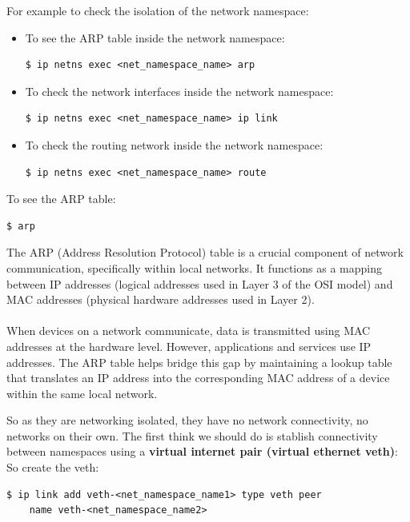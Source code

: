 \documentclass{article}
\newenvironment{blocktemplateII}[1]{%
    \tcolorbox[beamer,%
    noparskip,breakable,
    colframe=Green,%
    colbacklower=LimeGreen!75!LightGreen,%
    title=#1]}%
    {\endtcolorbox}
\newenvironment{codetemplate}[1][]{%
  \mybasecolorbox[#1]
  \itshape
}{%
  \endmybasecolorbox
}
\begin{document}
For example to check the isolation of the network namespace:
\begin{itemize}
    \item To see the ARP table inside the network namespace:
\begin{codetemplate}{}
\begin{verbatim}
$ ip netns exec <net_namespace_name> arp
\end{verbatim}
\end{codetemplate}
    \item To check the network interfaces inside the network namespace:
\begin{codetemplate}{}
\begin{verbatim}
$ ip netns exec <net_namespace_name> ip link
\end{verbatim}
\end{codetemplate}
    \item To check the routing network inside the network namespace:
\begin{codetemplate}{}
\begin{verbatim}
$ ip netns exec <net_namespace_name> route
\end{verbatim}
\end{codetemplate}
\end{itemize}

To see the ARP table:
\begin{codetemplate}{}
\begin{verbatim}
$ arp
\end{verbatim}
\end{codetemplate}

\begin{blocktemplateII}{NOTE}
The ARP (Address Resolution Protocol) table is a crucial component of network communication, specifically within local networks. It functions as a mapping between IP addresses (logical addresses used in Layer 3 of the OSI model) and MAC addresses (physical hardware addresses used in Layer 2).
\\\\
When devices on a network communicate, data is transmitted using MAC addresses at the hardware level. However, applications and services use IP addresses. The ARP table helps bridge this gap by maintaining a lookup table that translates an IP address into the corresponding MAC address of a device within the same local network.
\end{blocktemplateII}

So as they are networking isolated, they have no network connectivity, no networks on their own. The first think we should do is stablish connectivity between namespaces using a \textbf{virtual internet pair (virtual ethernet veth)}:
So create the veth:
\begin{codetemplate}{}
\begin{verbatim}
$ ip link add veth-<net_namespace_name1> type veth peer 
    name veth-<net_namespace_name2>
\end{verbatim}
\end{codetemplate}
\end{document}
